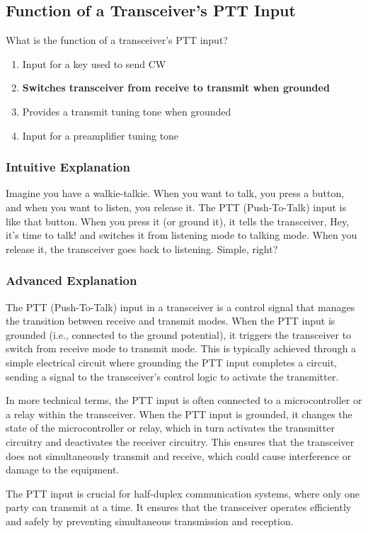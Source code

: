 \subsection{Function of a Transceiver’s PTT Input}
\label{T7A07}

\begin{tcolorbox}[colback=gray!10!white,colframe=black!75!black,title=T7A07]
What is the function of a transceiver’s PTT input?
\begin{enumerate}[label=\Alph*]
    \item Input for a key used to send CW
    \item \textbf{Switches transceiver from receive to transmit when grounded}
    \item Provides a transmit tuning tone when grounded
    \item Input for a preamplifier tuning tone
\end{enumerate}
\end{tcolorbox}

\subsubsection{Intuitive Explanation}
Imagine you have a walkie-talkie. When you want to talk, you press a button, and when you want to listen, you release it. The PTT (Push-To-Talk) input is like that button. When you press it (or ground it), it tells the transceiver, Hey, it’s time to talk! and switches it from listening mode to talking mode. When you release it, the transceiver goes back to listening. Simple, right?

\subsubsection{Advanced Explanation}
The PTT (Push-To-Talk) input in a transceiver is a control signal that manages the transition between receive and transmit modes. When the PTT input is grounded (i.e., connected to the ground potential), it triggers the transceiver to switch from receive mode to transmit mode. This is typically achieved through a simple electrical circuit where grounding the PTT input completes a circuit, sending a signal to the transceiver’s control logic to activate the transmitter.

In more technical terms, the PTT input is often connected to a microcontroller or a relay within the transceiver. When the PTT input is grounded, it changes the state of the microcontroller or relay, which in turn activates the transmitter circuitry and deactivates the receiver circuitry. This ensures that the transceiver does not simultaneously transmit and receive, which could cause interference or damage to the equipment.

The PTT input is crucial for half-duplex communication systems, where only one party can transmit at a time. It ensures that the transceiver operates efficiently and safely by preventing simultaneous transmission and reception.

